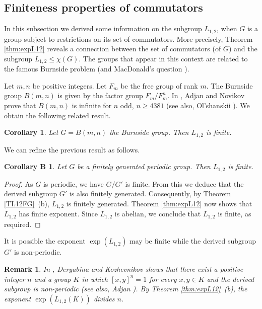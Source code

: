 \documentclass[12pt,leqno]{amsart}
\newtheorem{cor}[theorem]{\sc Corollary}
\newtheorem{remar}[theorem]{\sc Remark}
\newtheorem*{corB}{Corollary B}
\begin{document}
\subsection{Finiteness properties of commutators} In this subsection we derived some information on the subgroup $L_{1,2}$, when $G$ is a group subject to restrictions on its set of commutators. More precisely, Theorem \ref{thm:expL12} reveals a connection between the set of commutators (of $G$) and the subgroup $L_{1,2} \leq \chi(G)$. The groups that appear in this context are related to the famous Burnside problem (and MacDonald's question \cite[Question 13.34]{MK}). 

Let $m,n$ be positive integers. Let $F_m$ be the free group of rank $m$. The Burnside group $B(m,n)$ is given by the factor group $F_m/F^{n}_m$. In \cite{AN}, Adjan and Novikov prove that $B(m,n)$ is infinite for $n$ odd, $n \geq 4381$ (see also, Ol'shanskii \cite{Ol}). We obtain the following related result. 

\begin{cor}
Let $G = B(m,n)$ the Burnside group. Then $L_{1,2}$ is finite.     
\end{cor}

We can refine the previous result as follows. 

\begin{corB} \label{cor:periodic}
Let $G$ be a finitely generated periodic group. Then $L_{1,2}$ is finite. 
\end{corB}

\begin{proof}
As $G$ is periodic, we have $G/G'$ is finite. From  this we deduce that the derived subgroup $G'$ is also finitely generated. Consequently,  by Theorem \ref{TL12FG}~(b), $L_{1,2}$ is finitely generated. Theorem \ref{thm:expL12} now shows that $L_{1,2}$ has finite exponent. Since $L_{1,2}$ is abelian, we conclude that $L_{1,2}$ is finite, as required.     
\end{proof}

It is possible the exponent $\exp(L_{1,2})$ may be finite while the derived subgroup $G'$ is non-periodic. 

\begin{remar} \label{rem:exp}
In \cite{DK}, Deryabina and Kozhevnikov shows that there exist a positive integer $n$ and a group $K$ in which $[x,y]^n=1$ for every $x,y \in K$ and the derived subgroup is non-periodic (see also, Adjan \cite{A}). By Theorem \ref{thm:expL12}~(b), the exponent $\exp(L_{1,2}(K))$ divides $n$.  
\end{remar}
\end{document}
